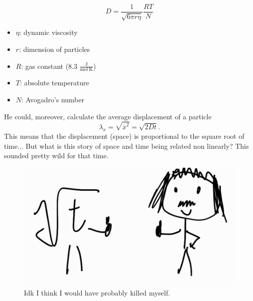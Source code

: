 \documentclass{report}
\begin{document}
\noindent
\begin{minipage}{0.5\textwidth}
	\begin{equation*}
		D=\frac{1}{\sqrt{6\pi r\eta}}\frac{RT}{N}
	\end{equation*}
\end{minipage}\begin{minipage}{0.5\textwidth}
\begin{itemize}
	\item $\eta$: dynamic viscosity
	\item $r$: dimension of particles
	\item $R$: gas constant (8.3 $\frac{\mathrm{J}}{\mathrm{mol~K}}$)
	\item $T$: absolute temperature
	\item $N$: Avogadro's number
\end{itemize}
\end{minipage}
He could, moreover, calculate the average displacement of a particle
\begin{equation*}
	\lambda_{x}=\sqrt{\overline{x}^{2}}=\sqrt{2Dt}.
\end{equation*}
This means that the displacement (space) is proportional to the square root of time... But what is this story of space and time being related non linearly? This sounded pretty wild for that time.
\begin{figure}[h]
	\centering
	\includegraphics[width=0.5\linewidth]{img/screenshot007}
	\caption{Idk I think I would have probably killed myself.}
	\label{fig:screenshot007}
\end{figure}
\end{document}
